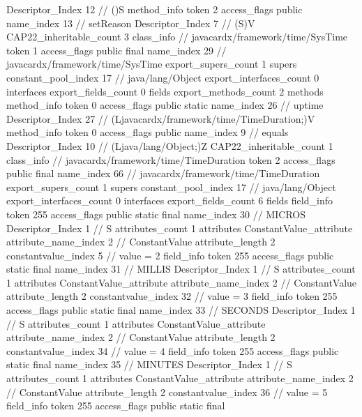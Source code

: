 {{{{{					Descriptor_Index	12		// ()S
				}
				method_info {
					token	2
					access_flags	public
					name_index	13		// setReason
					Descriptor_Index	7		// (S)V
				}
			}
			CAP22_inheritable_count	3
		}
		class_info {		// javacardx/framework/time/SysTime
			token	1
			access_flags	public final
			name_index	29		// javacardx/framework/time/SysTime
			export_supers_count	1
			supers {
				constant_pool_index	17		// java/lang/Object
			}
			export_interfaces_count	0
			interfaces {
			}
			export_fields_count	0
			fields {
			}
			export_methods_count	2
			methods {
				method_info {
					token	0
					access_flags	public static
					name_index	26		// uptime
					Descriptor_Index	27		// (Ljavacardx/framework/time/TimeDuration;)V
				}
				method_info {
					token	0
					access_flags	public
					name_index	9		// equals
					Descriptor_Index	10		// (Ljava/lang/Object;)Z
				}
			}
			CAP22_inheritable_count	1
		}
		class_info {		// javacardx/framework/time/TimeDuration
			token	2
			access_flags	public final
			name_index	66		// javacardx/framework/time/TimeDuration
			export_supers_count	1
			supers {
				constant_pool_index	17		// java/lang/Object
			}
			export_interfaces_count	0
			interfaces {
			}
			export_fields_count	6
			fields {
			field_info {
				token	255
				access_flags	public static final
				name_index	30		// MICROS
				Descriptor_Index	1		// S
				attributes_count	1
				attributes {
				ConstantValue_attribute {
					attribute_name_index	2		// ConstantValue
					attribute_length	2
					constantvalue_index	5		// value = 2
				}
				}
			}
			field_info {
				token	255
				access_flags	public static final
				name_index	31		// MILLIS
				Descriptor_Index	1		// S
				attributes_count	1
				attributes {
				ConstantValue_attribute {
					attribute_name_index	2		// ConstantValue
					attribute_length	2
					constantvalue_index	32		// value = 3
				}
				}
			}
			field_info {
				token	255
				access_flags	public static final
				name_index	33		// SECONDS
				Descriptor_Index	1		// S
				attributes_count	1
				attributes {
				ConstantValue_attribute {
					attribute_name_index	2		// ConstantValue
					attribute_length	2
					constantvalue_index	34		// value = 4
				}
				}
			}
			field_info {
				token	255
				access_flags	public static final
				name_index	35		// MINUTES
				Descriptor_Index	1		// S
				attributes_count	1
				attributes {
				ConstantValue_attribute {
					attribute_name_index	2		// ConstantValue
					attribute_length	2
					constantvalue_index	36		// value = 5
				}
				}
			}
			field_info {
				token	255
				access_flags	public static final
}}}}}
